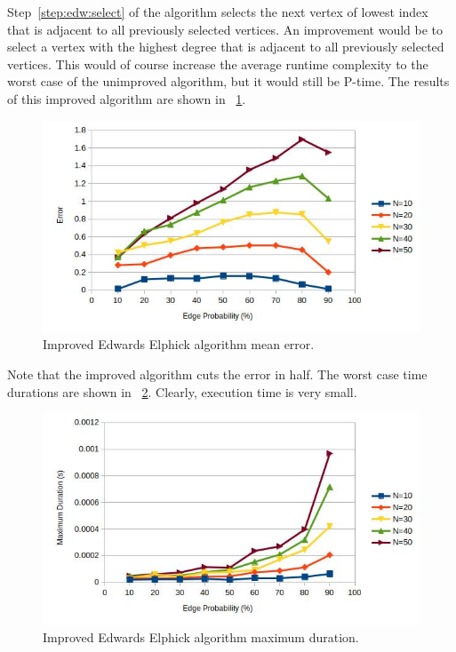 Step~\ref{step:edw:select} of the algorithm selects the next vertex of lowest index that is adjacent to all
previously selected vertices.  An improvement would be to select a vertex with the highest degree that is adjacent
to all previously selected vertices.  This would of course increase the average runtime complexity to the worst
case of the unimproved algorithm, but it would still be P-time.  The results of this improved algorithm are shown
in \figurename~\ref{fig:edwards2err}.

\begin{figure}[H]
  \centering
  \includegraphics[width=5in]{edwards2_error}
  \caption{Improved Edwards Elphick algorithm mean error.}
  \label{fig:edwards2err}
\end{figure}

Note that the improved algorithm cuts the error in half.  The worst case time durations are shown in
\figurename~\ref{fig:edwards2time}. Clearly, execution time is very small.

\begin{figure}[H]
  \centering
  \includegraphics[width=5in]{edwards2_time}
  \caption{Improved Edwards Elphick algorithm maximum duration.}
  \label{fig:edwards2time}
\end{figure}

